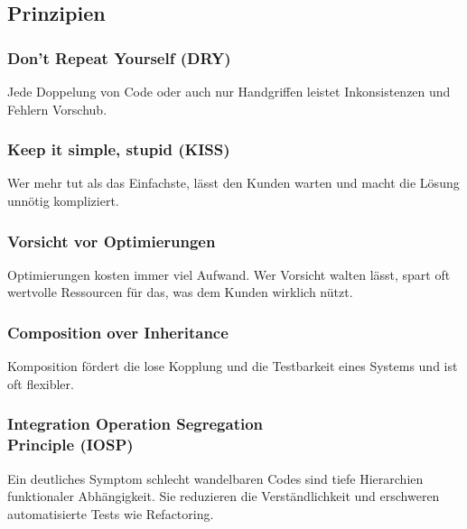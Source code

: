 \documentclass[a5paper, landscape]{article}
\begin{document}
	\footnotesize
	\color{textcolor}
	\begin{minipage}[t]{.5\textwidth}
		\subsection*{Prinzipien}
		\subsubsection*{Don't Repeat Yourself (DRY)}
		Jede Doppelung von Code oder auch nur Handgriffen leistet Inkonsistenzen und Fehlern Vorschub.
		\subsubsection*{Keep it simple, stupid (KISS)}
		Wer mehr tut als das Einfachste, lässt den Kunden warten und macht die Lösung unnötig kompliziert.
		\subsubsection*{Vorsicht vor Optimierungen}
		Optimierungen kosten immer viel Aufwand. Wer Vorsicht walten lässt, spart oft wertvolle Ressourcen für das, was dem Kunden wirklich nützt.
		\subsubsection*{Composition over Inheritance}
		Komposition fördert die lose Kopplung und die Testbarkeit eines Systems und ist oft flexibler.
		\subsubsection*{Integration Operation Segregation\\Principle (IOSP)}
		Ein deutliches Symptom schlecht wandelbaren Codes sind tiefe Hierarchien funktionaler Abhängigkeit. Sie reduzieren die Verständlichkeit und erschweren automatisierte Tests wie Refactoring.
	\end{minipage}
	\hspace{0.5cm}
\end{document}
